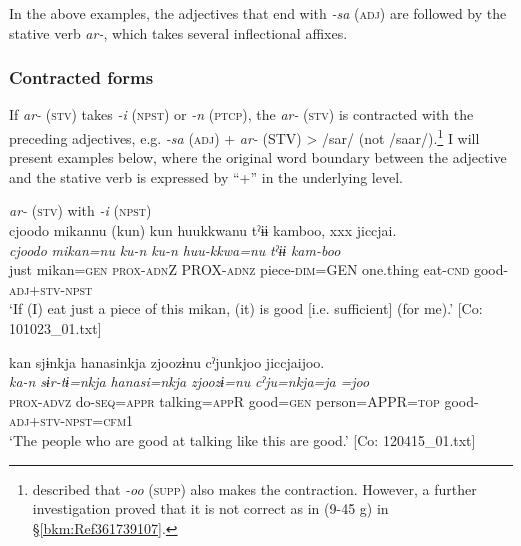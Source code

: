 In the above examples, the adjectives that end with \textit{{}-sa} (\textsc{adj}) are followed by the stative verb \textit{ar-}, which takes several inflectional affixes.

\subsubsection{Contracted forms}\label{sec:9.2.2.2}

If \textit{ar-} (\textsc{stv}) takes \textit{{}-i} (\textsc{npst}) or \textit{{}-n} (\textsc{ptcp}), the \textit{ar-} (\textsc{stv}) is contracted with the preceding adjectives, e.g. \textit{{}-sa} (\textsc{adj}) + \textit{ar-} (STV) > /sar/ (not /saar/).\footnote{\citet[71]{Niinaga2010} described that \textit{{}-oo} (\textsc{supp}) also makes the contraction. However, a further investigation proved that it is not correct as in (9-45 g) in §\ref{bkm:Ref361739107}.} I will present examples below, where the original word boundary between the adjective and the stative verb is expressed by “+” in the underlying level.

\ea   \textit{ar-} (\textsc{stv}) with \textit{{}-i} (\textsc{npst}) \label{ex:9.46}
  \ea\relax [= (7-25 b)]\\
    \glll  {\textbar}cjoodo  mikan{\textbar}nu  (kun)  kun  huukkwanu   tˀɨɨ  kamboo,  xxx  jiccjai.\\
      \textit{cjoodo}  \textit{mikan=nu}  \textit{ku-n}  \textit{ku-n}  \textit{huu-kkwa=nu}   \textit{tˀɨɨ}  \textit{kam-boo}  {}  \textit{}\\
      just  mikan=\textsc{gen}  \textsc{prox}-\textsc{adn}Z  PROX-\textsc{adnz}  piece-\textsc{dim}=GEN  one.thing  eat-\textsc{cnd}  {}  good-\textsc{adj}+\textsc{stv}-\textsc{npst}\\
      \glt       ‘If (I) eat just a piece of this mikan, (it) is good [i.e. sufficient] (for me).’ [Co: 101023\_01.txt]

\ex \label{ex:9.46b} %
    \glll  kan  sjɨnkja  hanasinkja  zjoozɨnu cˀjunkjoo  jiccjaijoo.\\
      \textit{ka-n}  \textit{sɨr-tɨ=nkja}  \textit{hanasi=nkja}  \textit{zjoozɨ=nu}  \textit{cˀju=nkja=ja}  \textit{=joo}\\
      \textsc{prox}-\textsc{advz}  do-\textsc{seq}=\textsc{appr}  talking=\textsc{app}R  good=\textsc{gen}   person=APPR=\textsc{top}  good-\textsc{adj}+\textsc{stv}-\textsc{npst}=\textsc{cfm}1\\
      \glt       ‘The people who are good at talking like this are good.’ [Co: 120415\_01.txt]

